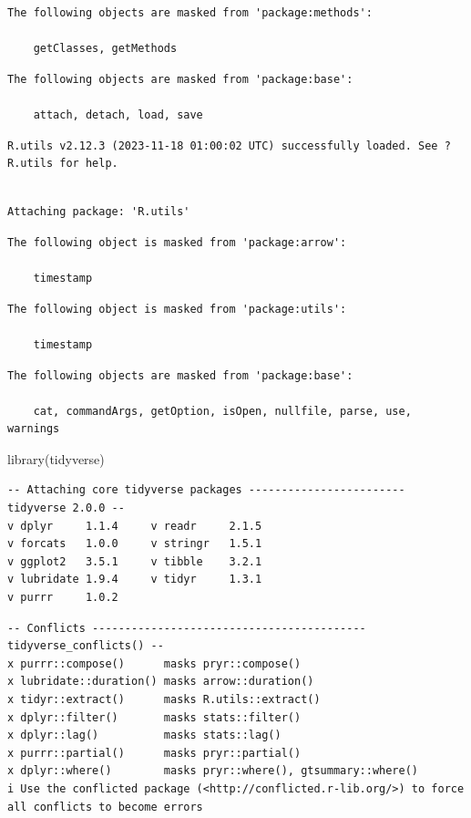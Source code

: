 \documentclass[
]{article}
\newenvironment{Shaded}{\begin{snugshade}}{\end{snugshade}}
\newcommand{\FunctionTok}[1]{\textcolor[rgb]{0.00,0.00,0.00}{#1}}
\newcommand{\NormalTok}[1]{\textcolor[rgb]{0.00,0.00,0.00}{#1}}
\begin{document}
\begin{verbatim}
The following objects are masked from 'package:methods':

    getClasses, getMethods
\end{verbatim}

\begin{verbatim}
The following objects are masked from 'package:base':

    attach, detach, load, save
\end{verbatim}

\begin{verbatim}
R.utils v2.12.3 (2023-11-18 01:00:02 UTC) successfully loaded. See ?R.utils for help.
\end{verbatim}

\begin{verbatim}

Attaching package: 'R.utils'
\end{verbatim}

\begin{verbatim}
The following object is masked from 'package:arrow':

    timestamp
\end{verbatim}

\begin{verbatim}
The following object is masked from 'package:utils':

    timestamp
\end{verbatim}

\begin{verbatim}
The following objects are masked from 'package:base':

    cat, commandArgs, getOption, isOpen, nullfile, parse, use, warnings
\end{verbatim}

\begin{Shaded}
\begin{Highlighting}[]
\FunctionTok{library}\NormalTok{(tidyverse)}
\end{Highlighting}
\end{Shaded}

\begin{verbatim}
-- Attaching core tidyverse packages ------------------------ tidyverse 2.0.0 --
v dplyr     1.1.4     v readr     2.1.5
v forcats   1.0.0     v stringr   1.5.1
v ggplot2   3.5.1     v tibble    3.2.1
v lubridate 1.9.4     v tidyr     1.3.1
v purrr     1.0.2     
\end{verbatim}

\begin{verbatim}
-- Conflicts ------------------------------------------ tidyverse_conflicts() --
x purrr::compose()      masks pryr::compose()
x lubridate::duration() masks arrow::duration()
x tidyr::extract()      masks R.utils::extract()
x dplyr::filter()       masks stats::filter()
x dplyr::lag()          masks stats::lag()
x purrr::partial()      masks pryr::partial()
x dplyr::where()        masks pryr::where(), gtsummary::where()
i Use the conflicted package (<http://conflicted.r-lib.org/>) to force all conflicts to become errors
\end{verbatim}
\end{document}
